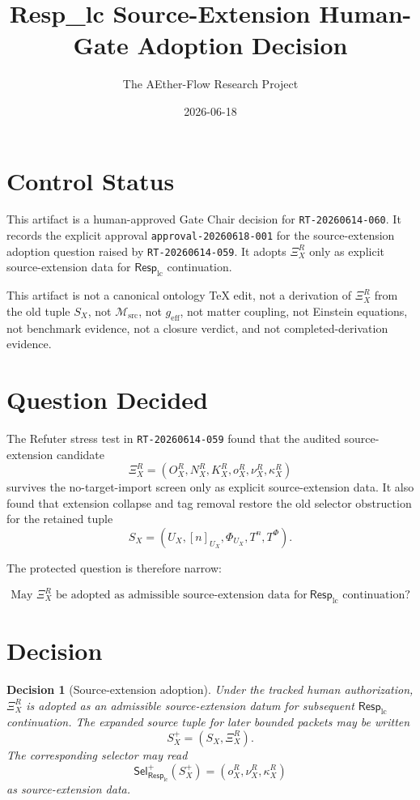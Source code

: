 \documentclass[11pt]{article}
\title{Resp\_lc Source-Extension Human-Gate Adoption Decision}
\author{The AEther-Flow Research Project}
\date{2026-06-18}
\newcommand{\RespLC}{\mathsf{Resp}_{\mathrm{lc}}}
\newcommand{\SelResp}{\mathsf{Sel}_{\RespLC}}
\newcommand{\Msrc}{\mathcal{M}_{\mathrm{src}}}
\newcommand{\geff}{g_{\mathrm{eff}}}
\newcommand{\XiR}{\Xi_X^R}
\newcommand{\SX}{S_X}
\newcommand{\Splus}{S_X^+}
\newtheorem{decision}{Decision}
\begin{document}
\maketitle

\section*{Control Status}

This artifact is a human-approved Gate Chair decision for
\texttt{RT-20260614-060}. It records the explicit approval
\texttt{approval-20260618-001} for the source-extension adoption question
raised by \texttt{RT-20260614-059}. It adopts \(\XiR\) only as explicit
source-extension data for \(\RespLC\) continuation.

This artifact is not a canonical ontology TeX edit, not a derivation of
\(\XiR\) from the old tuple \(\SX\), not \(\Msrc\), not \(\geff\), not
matter coupling, not Einstein equations, not benchmark evidence, not a
closure verdict, and not completed-derivation evidence.

\section{Question Decided}

The Refuter stress test in \texttt{RT-20260614-059} found that the
audited source-extension candidate
\[
  \XiR=(O_X^R,N_X^R,K_X^R,o_X^R,\nu_X^R,\kappa_X^R)
\]
survives the no-target-import screen only as explicit source-extension
data. It also found that extension collapse and tag removal restore the
old selector obstruction for the retained tuple
\[
  \SX=(U_X,[n]_{U_X},\Phi_{U_X},T^n,T^\Phi).
\]

The protected question is therefore narrow:

\[
\text{May }\XiR\text{ be adopted as admissible source-extension data for}
\ \RespLC\text{ continuation?}
\]

\section{Decision}

\begin{decision}[Source-extension adoption]
Under the tracked human authorization, \(\XiR\) is adopted as an
admissible source-extension datum for subsequent \(\RespLC\) continuation.
The expanded source tuple for later bounded packets may be written
\[
  \Splus=(\SX,\XiR).
\]
The corresponding selector may read
\[
  \SelResp^{+}(\Splus)=(o_X^R,\nu_X^R,\kappa_X^R)
\]
as source-extension data.
\end{decision}
\end{document}
